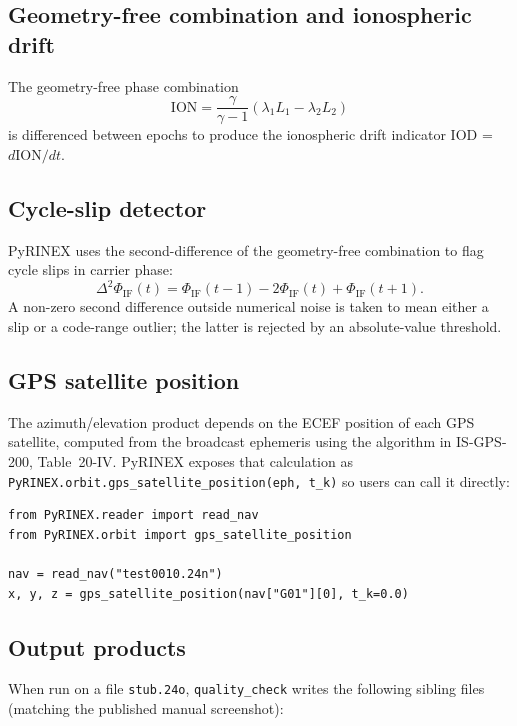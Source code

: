 \documentclass[11pt,a4paper]{article}
\begin{document}
\subsection{Geometry-free combination and ionospheric drift}

The geometry-free phase combination
\begin{equation}
    \mathrm{ION} = \frac{\gamma}{\gamma - 1}
                    (\lambda_1 L_1 - \lambda_2 L_2)
\end{equation}
is differenced between epochs to produce the
ionospheric drift indicator IOD = $d\mathrm{ION}/dt$.

\subsection{Cycle-slip detector}

PyRINEX uses the second-difference of the geometry-free combination
to flag cycle slips in carrier phase:
\begin{equation}
    \Delta^2 \Phi_{\mathrm{IF}}(t) = \Phi_{\mathrm{IF}}(t-1)
        - 2\Phi_{\mathrm{IF}}(t) + \Phi_{\mathrm{IF}}(t+1).
\end{equation}
A non-zero second difference outside numerical noise is taken to mean
either a slip or a code-range outlier; the latter is rejected by an
absolute-value threshold.

\subsection{GPS satellite position}

The azimuth/elevation product depends on the ECEF position of each
GPS satellite, computed from the broadcast ephemeris using the
algorithm in IS-GPS-200, Table~20-IV. PyRINEX exposes that
calculation as \texttt{PyRINEX.orbit.gps\_satellite\_position(eph,
t\_k)} so users can call it directly:

\begin{lstlisting}
from PyRINEX.reader import read_nav
from PyRINEX.orbit import gps_satellite_position

nav = read_nav("test0010.24n")
x, y, z = gps_satellite_position(nav["G01"][0], t_k=0.0)
\end{lstlisting}

\subsection{Output products}

When run on a file \texttt{stub.24o}, \texttt{quality\_check} writes
the following sibling files (matching the published manual screenshot):
\end{document}

